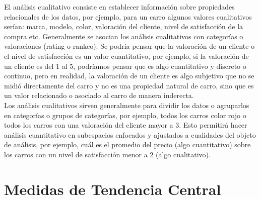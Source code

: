 \documentclass{article}
\begin{document}
El análisis cualitativo consiste en establecer información sobre propiedades relacionales de los datos, por ejemplo, para un carro algunos valores cualitativos serían: marca, modelo, color, valoración del cliente, nivel de satisfacción de la compra etc. Generalmente se asocian los análisis cualitativos con categorías o valoraciones (rating o rankeo). Se podría pensar que la valoración de un cliente o el nivel de satisfacción es un valor cuantitativo, por ejemplo, si la valoración de un cliente es del 1 al 5, podríamos pensar que es algo cuantitativo y discreto o continuo, pero en realidad, la valoración de un cliente es algo subjetivo que no se midió directamente del carro y no es una propiedad natural de carro, sino que es un valor relacionado o asociado al carro de manera inderecta.
\\[12pt]
Los análisis cualitativos sirven generalmente para dividir los datos o agruparlos en categorías o grupos de categorías, por ejemplo, todos los carros color rojo o todos los carros con una valoración del cliente mayor a 3. Esto permitirá hacer análisis cuantitativo en subespacios enfocados y ajustados a cualidades del objeto de análisis, por ejemplo, cuál es el promedio del precio (algo cuantitativo) sobre los carros con un nivel de satisfacción menor a 2 (algo cualitativo).

\section{Medidas de Tendencia Central}
\end{document}
